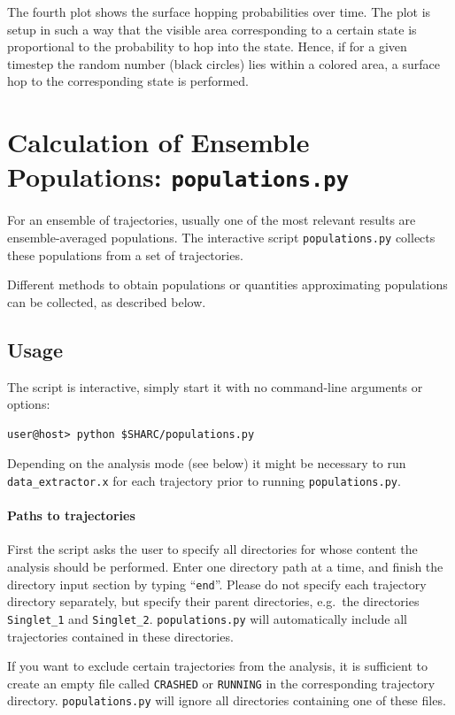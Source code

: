 \documentclass[a4paper,11pt,DIV=15,openany,twoside=false]{scrbook}
\newcommand{\ttt}[1]{\texttt{#1}}
\begin{document}
The fourth plot shows the surface hopping probabilities over time. The plot is setup in such a way that the visible area corresponding to a certain state is proportional to the probability to hop into the state. Hence, if for a given timestep the random number (black circles) lies within a colored area, a surface hop to the corresponding state is performed.

\section{Calculation of Ensemble Populations: \ttt{populations.py}}\label{sec:populations.py}

For an ensemble of trajectories, usually one of the most relevant results are ensemble-averaged populations. The interactive script \ttt{populations.py} collects these populations from a set of trajectories. 

Different methods to obtain populations or quantities approximating populations can be collected, as described below.

\subsection{Usage}

The script is interactive, simply start it with no command-line arguments or options:
\begin{verbatim}
user@host> python $SHARC/populations.py
\end{verbatim}

Depending on the analysis mode (see below) it might be necessary to run \ttt{data\_extractor.x} for each trajectory prior to running \ttt{populations.py}. 

\paragraph{Paths to trajectories}

First the script asks the user to specify all directories for whose content the analysis should be performed. Enter one directory path at a time, and finish the directory input section by typing ``\ttt{end}''. Please do not specify each trajectory directory separately, but specify their parent directories, e.g.\ the directories \ttt{Singlet\_1} and \ttt{Singlet\_2}. \ttt{populations.py} will automatically include all trajectories contained in these directories.

If you want to exclude certain trajectories from the analysis, it is sufficient to create an empty file called \ttt{CRASHED} or \ttt{RUNNING} in the corresponding trajectory directory. \ttt{populations.py} will ignore all directories containing one of these files.
\end{document}
